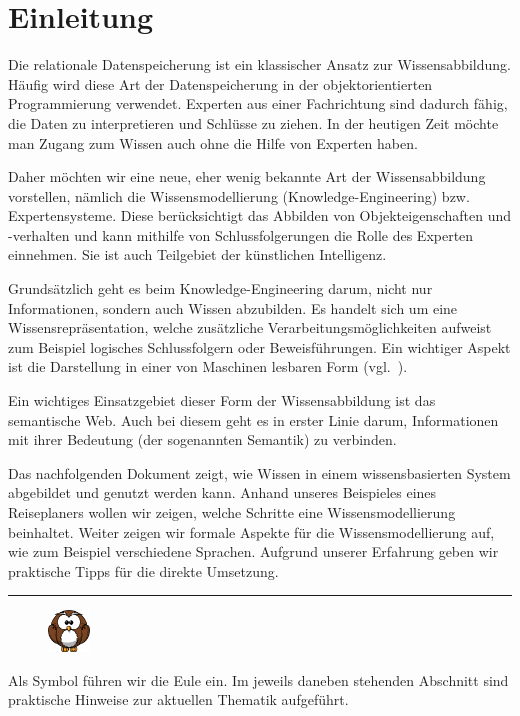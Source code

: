 \chapter{Einleitung}
\label{chap:einleitung}
Die relationale Datenspeicherung ist ein klassischer Ansatz zur Wissensabbildung. Häufig wird diese Art der Datenspeicherung in der objektorientierten Programmierung verwendet. Experten aus einer Fachrichtung sind dadurch fähig, die Daten zu interpretieren und Schlüsse zu ziehen. In der heutigen Zeit möchte man Zugang zum Wissen auch ohne die Hilfe von Experten haben. 

Daher möchten wir eine neue, eher wenig bekannte Art der Wissensabbildung vorstellen, nämlich die Wissensmodellierung (Knowledge-Engineering) bzw. Expertensysteme. Diese berücksichtigt das Abbilden von Objekteigenschaften und -verhalten und kann mithilfe von Schlussfolgerungen die Rolle des Experten einnehmen. Sie ist auch Teilgebiet der künstlichen Intelligenz.

Grundsätzlich geht es beim Knowledge-Engineering darum, nicht nur Informationen, sondern auch Wissen abzubilden. Es handelt sich um eine Wissensrepräsentation, welche zusätzliche Verarbeitungsmöglichkeiten aufweist zum Beispiel logisches Schlussfolgern oder Beweisführungen. Ein wichtiger Aspekt ist die Darstellung in einer von Maschinen lesbaren Form (vgl.~\cite[S. 308]{ISpekOntoGeschichte}).

Ein wichtiges Einsatzgebiet dieser Form der Wissensabbildung ist das semantische Web. Auch bei diesem geht es in erster Linie darum, Informationen mit ihrer Bedeutung (der sogenannten Semantik) zu verbinden.

Das nachfolgenden Dokument zeigt, wie Wissen in einem wissensbasierten System abgebildet und genutzt werden kann. Anhand unseres Beispieles eines Reiseplaners wollen wir zeigen, welche Schritte eine Wissensmodellierung beinhaltet. Weiter zeigen wir formale Aspekte für die Wissensmodellierung auf, wie zum Beispiel verschiedene Sprachen. Aufgrund unserer Erfahrung geben wir praktische Tipps für die direkte Umsetzung.

\noindent\rule[1ex]{\textwidth}{1pt}
\begin{figure}
    \vspace{-12pt}
    \includegraphics[width=0.1\textwidth]{bilder/owl.png}\protect\footnotemark{}
\end{figure}
Als Symbol führen wir die Eule ein. Im jeweils daneben stehenden Abschnitt sind praktische Hinweise zur aktuellen Thematik aufgeführt.

